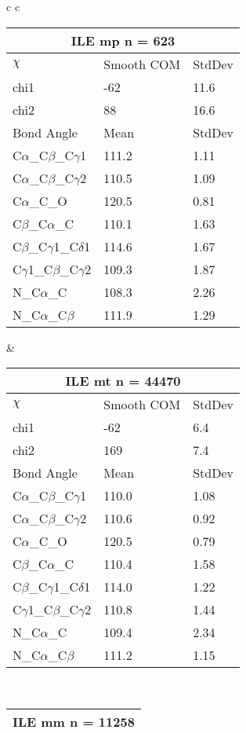 \begin{longtable}{ c c }
\begin{tabular}{ l l l }
  \toprule
  \multicolumn{3}{c}{ILE \textbf{mp} n = 623} \\ \toprule
  $\chi$       & Smooth COM & StdDev \\ \midrule
  chi1 & -62 & 11.6 \\ 
  chi2 & 88 & 16.6 \\ \midrule
  Bond Angle   & Mean     & StdDev \\ \midrule
  C$\alpha$\_C$\beta$\_C$\gamma$1 & 111.2 & 1.11\\
  C$\alpha$\_C$\beta$\_C$\gamma$2 & 110.5 & 1.09\\
  C$\alpha$\_C\_O & 120.5 & 0.81\\
  C$\beta$\_C$\alpha$\_C & 110.1 & 1.63\\
  C$\beta$\_C$\gamma$1\_C$\delta$1 & 114.6 & 1.67\\
  C$\gamma$1\_C$\beta$\_C$\gamma$2 & 109.3 & 1.87\\
  N\_C$\alpha$\_C & 108.3 & 2.26\\
  N\_C$\alpha$\_C$\beta$ & 111.9 & 1.29\\
  \bottomrule
  \end{tabular}
  &
  \begin{tabular}{ l l l }
  \toprule
  \multicolumn{3}{c}{ILE \textbf{mt} n = 44470} \\ \toprule
  $\chi$       & Smooth COM & StdDev \\ \midrule
  chi1 & -62 & 6.4 \\ 
  chi2 & 169 & 7.4 \\ \midrule
  Bond Angle   & Mean     & StdDev \\ \midrule
  C$\alpha$\_C$\beta$\_C$\gamma$1 & 110.0 & 1.08\\
  C$\alpha$\_C$\beta$\_C$\gamma$2 & 110.6 & 0.92\\
  C$\alpha$\_C\_O & 120.5 & 0.79\\
  C$\beta$\_C$\alpha$\_C & 110.4 & 1.58\\
  C$\beta$\_C$\gamma$1\_C$\delta$1 & 114.0 & 1.22\\
  C$\gamma$1\_C$\beta$\_C$\gamma$2 & 110.8 & 1.44\\
  N\_C$\alpha$\_C & 109.4 & 2.34\\
  N\_C$\alpha$\_C$\beta$ & 111.2 & 1.15\\
  \bottomrule
  \end{tabular}
  \\
  \begin{tabular}{ l l l }
  \toprule
  \multicolumn{3}{c}{ILE \textbf{mm} n = 11258} \\ \toprule

\end{tabular}
\end{longtable}
